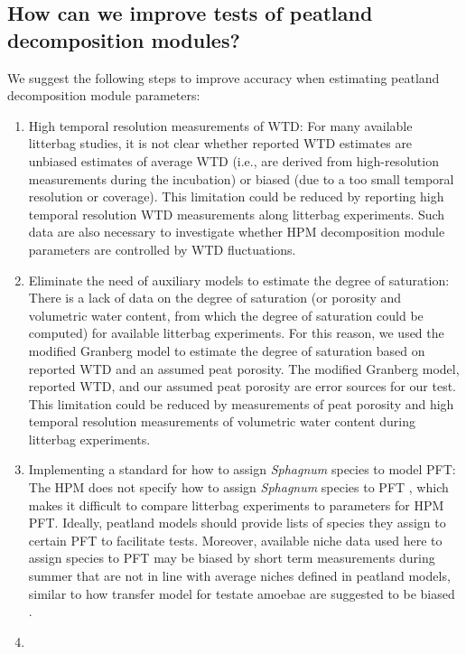 \documentclass[esd, manuscript]{copernicus}
\begin{document}
\subsection{How can we improve tests of peatland decomposition modules?}

We suggest the following steps to improve accuracy when estimating peatland decomposition module parameters:

\begin{enumerate}
\def\labelenumi{\arabic{enumi}.}
\item
  High temporal resolution measurements of WTD: For many available litterbag studies, it is not clear whether reported WTD estimates are unbiased estimates of average WTD (i.e., are derived from high-resolution measurements during the incubation) or biased (due to a too small temporal resolution or coverage). This limitation could be reduced by reporting high temporal resolution WTD measurements along litterbag experiments. Such data are also necessary to investigate whether HPM decomposition module parameters are controlled by WTD fluctuations.
\item
  Eliminate the need of auxiliary models to estimate the degree of saturation: There is a lack of data on the degree of saturation (or porosity and volumetric water content, from which the degree of saturation could be computed) for available litterbag experiments. For this reason, we used the modified Granberg model to estimate the degree of saturation based on reported WTD and an assumed peat porosity. The modified Granberg model, reported WTD, and our assumed peat porosity are error sources for our test. This limitation could be reduced by measurements of peat porosity and high temporal resolution measurements of volumetric water content during litterbag experiments.
\item
  Implementing a standard for how to assign \emph{Sphagnum} species to model PFT: The HPM does not specify how to assign \emph{Sphagnum} species to PFT \citep{Frolking.2010}, which makes it difficult to compare litterbag experiments to parameters for HPM PFT. Ideally, peatland models should provide lists of species they assign to certain PFT to facilitate tests. Moreover, available niche data used here to assign species to PFT may be biased by short term measurements during summer that are not in line with average niches defined in peatland models, similar to how transfer model for testate amoebae are suggested to be biased \citep{Swindles.2015}.
\item

\end{enumerate}
\end{document}

